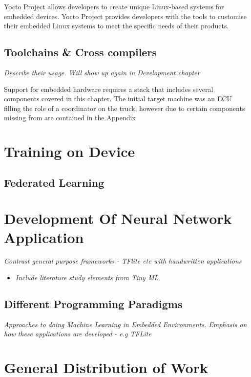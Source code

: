 Yocto Project allows developers to create unique Linux-based systems for embedded devices. Yocto Project provides developers with the tools to customise their embedded Linux systems to meet the specific needs of their products.

\subsection[SDKs \& Compiler Toolchains]{Toolchains \& Cross compilers}
\textit{Describe their usage. Will show up again in Development chapter}

Support for embedded hardware requires a stack that includes several components covered in this chapter. The initial target machine was an ECU filling the role of a coordinator on the truck, however due to certain components missing from are contained in the Appendix \cite{}

\section{Training on Device}

\subsection{Federated Learning}

\section[Development of Neural Network Application]{Development Of Neural Network Application}
\textit{Contrast general purpose frameworks - TFlite etc with handwritten applications}

\begin{itemize}
	\item \textit{Include literature study elements from Tiny ML}
\end{itemize}

\subsection{Different Programming Paradigms}
\textit{Approaches to doing Machine Learning in Embedded Environments. Emphasis on how these applications are developed - e.g TFLite}

\section{General Distribution of Work}

